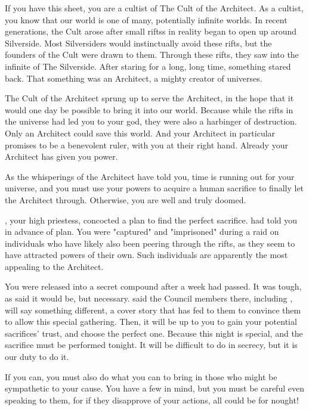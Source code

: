 \documentclass[blue]{Silversiders}
\begin{document}
\name{\bCult{}}

If you have this sheet, you are a cultist of The Cult of the Architect. As a cultist, you know that our world is one of many, potentially infinite worlds. In recent generations, the Cult arose after small riftss in reality began to open up around Silverside. Most Silversiders would instinctually avoid these rifts, but the founders of the Cult were drawn to them. Through these rifts, they saw into the infinite of The Silverside. After staring for a long, long time, something stared back. That something was an Architect, a mighty creator of universes.

The Cult of the Architect sprung up to serve the Architect, in the hope that it would one day be possible to bring it into our world. Because while the rifts in the universe had led you to your god, they were also a harbinger of destruction. Only an Architect could save this world. And your Architect in particular promises to be a benevolent ruler, with you at their right hand. Already your Architect has given you power. 


As the whisperings of the Architect have told you, time is running out for your universe, and you must use your powers to acquire a human sacrifice to finally let the Architect through. Otherwise, you are well and truly doomed.

\cWar{}, your high priestess, concocted a plan to find the perfect sacrifice. \cWar{\They} had told you in advance of \cWar{\their} plan. You were "captured" and "imprisoned" during a raid on individuals who have likely also been peering through the rifts, as they seem to have attracted powers of their own. Such individuals are apparently the most appealing to the Architect.

You were released into a secret compound after a week had passed. It was tough, as \cWar{} said it would be, but necessary. \cWar{\They} said the Council members there, including \cWar{\them}, will say something different, a cover story that \cWar{\they} has fed to them to convince them to allow this special gathering. Then, it will be up to you to gain your potential sacrifices' trust, and choose the perfect one. Because this night is special, and the sacrifice must be performed tonight. It will be difficult to do in secrecy, but it is our duty to do it.

If you can, you must also do what you can to bring in those who might be sympathetic to your cause. You have a few in mind, but you must be careful even speaking to them, for if they disapprove of your actions, all could be for nought!
\end{document}
